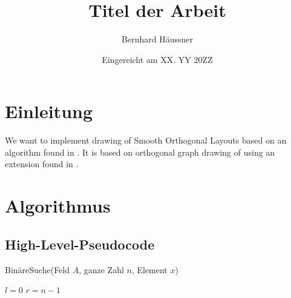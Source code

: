 \documentclass[a4paper]{scrreprt}
\theoremstyle{definition}
\begin{document}


\subject{Bachelorarbeit}
\title{Titel der Arbeit} %
\author{Bernhard Häussner} %
\date{Eingereicht am XX. YY 20ZZ} %
\titlehead{Julius-Maximilians-Universität Würzburg\\
Institut für Informatik\\
Lehrstuhl für Informatik I\\
Effiziente Algorithmen und wissensbasierte Systeme}
\publishers{Betreuer:\\
Prof.\ Dr.\ Alexander Wolff\\
Dipl.-Inf.\ Philipp Kindermann} %
\maketitle
\tableofcontents






\chapter{Einleitung}



We want to implement drawing of Smooth Orthogonal Layouts based on an algorithm found in
\cite{smooth-13}. It is based on orthogonal graph drawing of \cite{biedl+kant-98} using an
extension found in \cite{liu+etal-98}.

\chapter{Algorithmus}

\section{High-Level-Pseudocode}


\begin{algorithm}[ht]
  \caption{BinäreSuche(Feld $A$, ganze Zahl $n$, Element $x$)}
  \label{alg:binsearch}
  
  $l = 0$ \;
  $r = n-1$ \;
  
  \Return \False
\end{algorithm}
\end{document}
